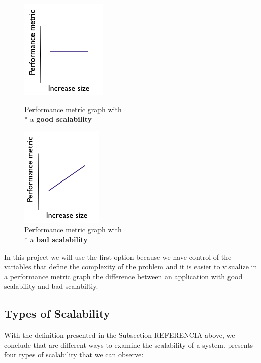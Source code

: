 \begin{figure}[ht]
\begin{minipage}[b]{0.5\linewidth}
\centering
\includegraphics[scale=0.7]{images/scalabilitygood}
\caption{Performance metric graph with \\* a \textbf{good scalability}}
\label{fig:goodscalability}
\end{minipage}
\hspace{0.5cm}
\begin{minipage}[b]{0.5\linewidth}
\centering
\includegraphics[scale=0.7]{images/scalabilitybad}
\caption{Performance metric graph with \\* a \textbf{bad scalability}}
\label{fig:badscalability}
\end{minipage}
\end{figure}


In this project we will use the first option because we have control of the variables that define the complexity of the problem and it is easier to visualize in a performance metric graph the difference between an application with good scalability and bad scalabiltiy.

\subsection{Types of Scalability}
With the definition presented in the Subsection REFERENCIA above, we conclude that are different ways to examine the scalability of a system. \cite{BONDI} presents four types of scalability that we can observe:

